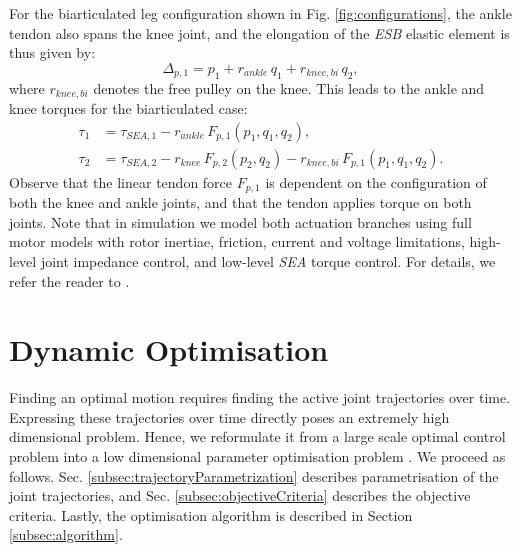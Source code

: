 \documentclass[letterpaper, 10 pt, conference]{ieeeconf}  %
\begin{document}
For the biarticulated leg configuration shown in Fig. \ref{fig:configurations}, the ankle tendon also spans the knee joint, and the elongation of the \textit{ESB} elastic element is thus given by:
\begin{equation}
	\Delta_{p,1} = p_1 + r_{ankle} \, q_1 + r_{knee,bi} \, q_2,
	\label{eq:Delta_p_biart}
\end{equation}
where $r_{knee,bi}$ denotes the free pulley on the knee. This leads to the ankle and knee torques for the biarticulated case:
\begin{equation}
	\begin{aligned}
		\tau_1 &= \tau_{SEA,1} - r_{ankle} \, F_{p,1}(p_1,q_1,q_2), \\
		\tau_2 &= \tau_{SEA,2} - r_{knee} \, F_{p,2}(p_2,q_2) - r_{knee,bi} \, F_{p,1}(p_1,q_1,q_2).
	\end{aligned}
\end{equation}
Observe that the linear tendon force $F_{p,1}$ is dependent on the configuration of both the knee and ankle joints, and that the tendon applies torque on both joints.
Note that in simulation we model both actuation branches using full motor models with rotor inertiae, friction, current and voltage limitations, high-level joint impedance control, and low-level \textit{SEA} torque control. For details, we refer the reader to \cite{roozing2016design}.


\section{Dynamic Optimisation} 
\label{sec:dynamicOptimisation}
Finding an optimal motion requires finding the active joint trajectories over time. Expressing these trajectories over time directly poses an extremely high dimensional problem. Hence, we reformulate it from a large scale optimal control problem into a low dimensional parameter optimisation problem \cite{kaphle2008optimality}. We proceed as follows. Sec. \ref{subsec:trajectoryParametrization} describes parametrisation of the joint trajectories, and Sec. \ref{subsec:objectiveCriteria} describes the objective criteria. Lastly, the optimisation algorithm is described in Section \ref{subsec:algorithm}.
\end{document}
